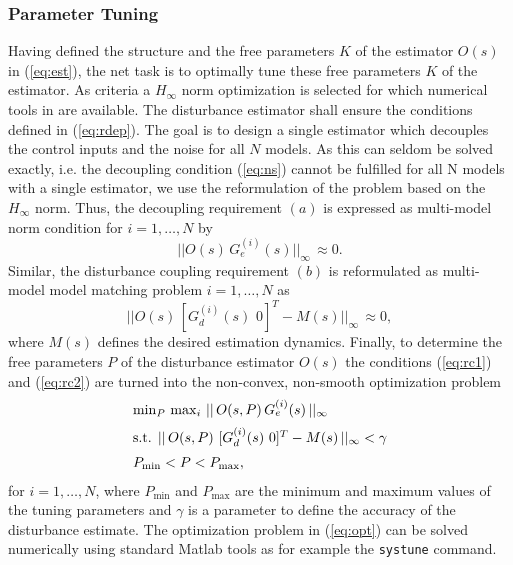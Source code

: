 \documentclass[graybox]{svmult}
\begin{document}
\subsubsection{Parameter Tuning}\label{sec:tuning}
Having defined the structure and the free parameters $K$ of the estimator $O(s)$ in (\ref{eq:est}), the net task is to optimally tune these free parameters $K$ of the estimator. As criteria a $H_\infty$ norm optimization is selected for which numerical tools in \matlab are available. The disturbance estimator shall ensure the conditions defined in (\ref{eq:rdep}). The goal is to design a single estimator which decouples the control inputs and the noise for all $N$ models. As this can seldom be solved exactly, i.e. the decoupling condition (\ref{eq:ns}) cannot be fulfilled for all N models with a single estimator, we use the reformulation of the problem based on the $H_\infty$ norm. Thus, the decoupling requirement $(a)$ is expressed as  multi-model norm condition for  $i=1,\dots,N$ by
\begin{equation}\label{eq:rc1}
||O(s) \, G_e^{(i)}(s) ||_\infty  \,\approx 0.
\end{equation}
Similar, the disturbance coupling requirement $(b)$ is reformulated as multi-model model matching problem  $i=1,\dots,N$ as
\begin{equation}\label{eq:rc2}
|| O(s) \, [ G_d^{(i)}(s) \,\, 0 ]^T - M(s) ||_\infty \,\approx 0,
\end{equation}
where $M(s)$ defines the desired estimation dynamics. Finally, to determine the free parameters $P$ of the disturbance estimator $O(s)$ the conditions (\ref{eq:rc1}) and (\ref{eq:rc2}) are turned into the non-convex, non-smooth optimization problem
\begin{equation} \label{eq:opt}
\begin{array}{l}
\min_{P} \, \max_{i} \, || \, O(s,P) \, G_e^{(i)}(s) \, ||_\infty \vspace{+2mm} \\
\textnormal{s.t. } ||\, O(s,P) \,\, [ G_d^{(i)}(s) \,\, 0 ]^T - M(s) \, ||_\infty < \gamma \vspace{+2mm} \\
P_{\min} < P < P_{\max},
\end{array}
\end{equation}
for $i=1,\dots,N$, where $P_{\min}$ and $P_{\max}$ are the minimum and maximum values of the tuning parameters and $\gamma$ is a parameter to define the accuracy of the disturbance estimate. The optimization problem in (\ref{eq:opt}) can be  solved numerically using standard Matlab tools as for example the \texttt{systune} command.
\end{document}
